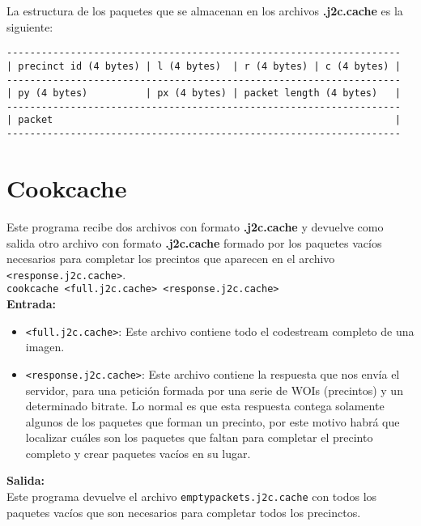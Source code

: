 \documentclass[11pt,a4paper]{article}
\begin{document}
La estructura de los paquetes que se almacenan en los archivos \textbf{.j2c.cache} es la siguiente:
  
\begin{verbatim}  
--------------------------------------------------------------------
| precinct id (4 bytes) | l (4 bytes)  | r (4 bytes) | c (4 bytes) |
--------------------------------------------------------------------
| py (4 bytes)          | px (4 bytes) | packet length (4 bytes)   | 
--------------------------------------------------------------------
| packet                                                           |
--------------------------------------------------------------------
\end{verbatim}

\section{Cookcache}

Este programa recibe dos archivos con formato \textbf{.j2c.cache} y devuelve como salida
otro archivo con formato \textbf{.j2c.cache} formado por los paquetes vac\'ios necesarios
para completar los precintos que aparecen en el archivo \texttt{<response.j2c.cache>}. \\

{\color{blue}\texttt{cookcache <full.j2c.cache> <response.j2c.cache>}} \\

\textbf{Entrada:}

\begin{itemize}
\item \texttt{<full.j2c.cache>}: Este archivo contiene todo el codestream completo de una imagen.
\item \texttt{<response.j2c.cache>}: Este archivo contiene la respuesta que nos env\'ia el servidor,
para una petici\'on formada por una serie de WOIs (precintos) y un determinado bitrate. Lo normal es que esta
respuesta contega solamente algunos de los paquetes que forman un precinto, por este motivo habr\'a que
localizar cu\'ales son los paquetes que faltan para completar el precinto completo y crear paquetes
vac\'ios en su lugar.
\end{itemize}

\textbf{Salida:} \\

Este programa devuelve el archivo \texttt{emptypackets.j2c.cache} con todos los paquetes vac\'ios
que son necesarios para completar todos los precinctos.
\end{document}
